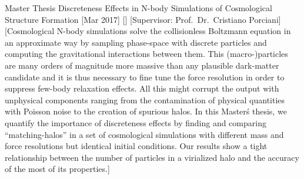 \begin{cvsection}{Master Thesis}
    \cvitem
    {Discreteness Effects in N-body Simulations of Cosmological Structure Formation}
    [Mar 2017]
    [\ipa]
    [Supervisor: Prof.\ Dr.\ Cristiano Porciani]
    [Cosmological N-body simulations solve the collisionless Boltzmann equation in an approximate way by sampling phase-space with discrete particles and computing the gravitational interactions between them. This (macro-)particles are many orders of magnitude more massive than any plausible dark-matter candidate and it is thus necessary to fine tune the force resolution in order to suppress few-body relaxation effects. All this might corrupt the output with unphysical components ranging from the contamination of physical quantities with Poisson noise to the creation of spurious halos. In this Master\'s thesis, we quantify the importance of discreteness effects by finding and comparing ``matching-halos'' in a set of cosmological simulations with different mass and force resolutions but identical initial conditions. Our results show a tight relationship between the number of particles in a virialized halo and the accuracy of the most of its properties.]
\end{cvsection}